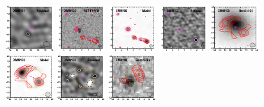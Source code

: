 \documentclass[iop]{emulateapj}
\begin{document}
\begin{figure}[!tbp]
\begin{centering}
\includegraphics[width=0.162\textwidth]{../Figures/modelfit/XMM101_residual_bestfit.pdf}
\includegraphics[width=0.162\textwidth]{../Figures/modelfit/XMM102_optical_bestfit.pdf}
\includegraphics[width=0.162\textwidth]{../Figures/modelfit/XMM102_model_bestfit.pdf}
\includegraphics[width=0.162\textwidth]{../Figures/modelfit/XMM102_residual_bestfit.pdf}
\includegraphics[width=0.162\textwidth]{../Figures/modelfit/XMM108_optical_bestfit.pdf}
\includegraphics[width=0.162\textwidth]{../Figures/modelfit/XMM108_model_bestfit.pdf}
\includegraphics[width=0.162\textwidth]{../Figures/modelfit/XMM108_residual_bestfit.pdf}
\includegraphics[width=0.162\textwidth]{../Figures/modelfit/XMM109_optical_bestfit.pdf}

\end{centering}
\end{figure}
\end{document}

